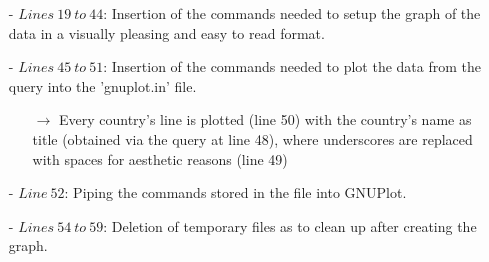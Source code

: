 \documentclass{article}
\begin{document}
\begin{itemize}
    \item[-]$Lines\ 19\ to\ 44$: Insertion of the commands needed to setup the graph of the data in a visually pleasing and easy to read format.
    \item[-]$Lines\ 45\ to\ 51$: Insertion of the commands needed to plot the data from the query into the 'gnuplot.in' file.
    \begin{itemize}
        \item[$\rightarrow$] Every country's line is plotted (line 50) with the country's name as title (obtained via the query at line 48), where underscores are replaced with spaces for aesthetic reasons (line 49)
    \end{itemize}
    \item[-]$Line\ 52$: Piping the commands stored in the file into GNUPlot.
    \item[-]$Lines\ 54\ to\ 59$: Deletion of temporary files as to clean up after creating the graph.
\end{itemize}
\end{document}

